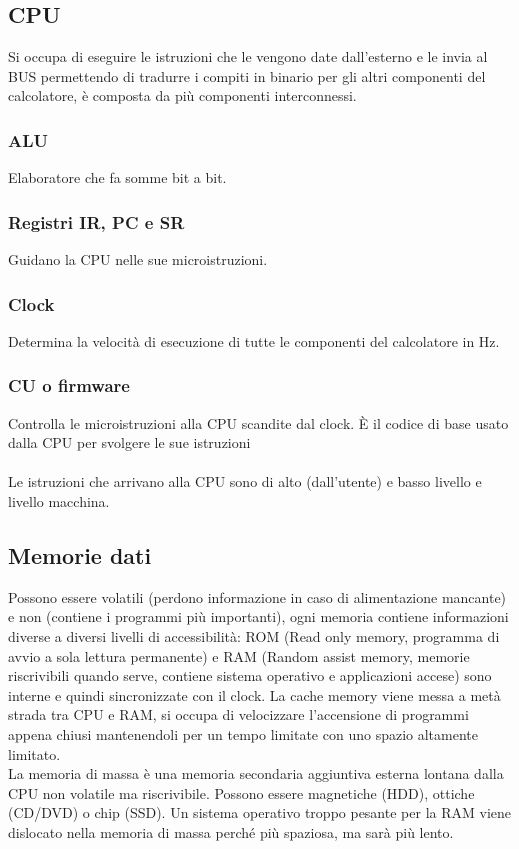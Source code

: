 \documentclass[10pt]{article}
\begin{document}
\subsection*{CPU}
Si occupa di eseguire le istruzioni che le vengono date dall'esterno e le invia al BUS permettendo di tradurre i compiti in binario per gli altri componenti del calcolatore, è composta da più componenti interconnessi.
\subsubsection*{ALU}
Elaboratore che fa somme bit a bit.
\subsubsection*{Registri IR, PC e SR}
Guidano la CPU nelle sue microistruzioni.
\subsubsection*{Clock}
Determina la velocità di esecuzione di tutte le componenti del calcolatore in Hz.
\subsubsection*{CU o firmware}
Controlla le microistruzioni alla CPU scandite dal clock. È il codice di base usato dalla CPU per svolgere le sue istruzioni\\
\\
Le istruzioni che arrivano alla CPU sono di alto (dall'utente) e basso livello e livello macchina.\\
\subsection*{Memorie dati}
Possono essere volatili (perdono informazione in caso di alimentazione mancante) e non (contiene i programmi più importanti), ogni memoria contiene informazioni diverse a diversi livelli di accessibilità: ROM (Read only memory, programma di avvio a sola lettura permanente) e RAM (Random assist memory, memorie riscrivibili quando serve, contiene sistema operativo e applicazioni accese) sono interne e quindi sincronizzate con il clock. La cache memory viene messa a metà strada tra CPU e RAM, si occupa di velocizzare l'accensione di programmi appena chiusi mantenendoli per un tempo limitate con uno spazio altamente limitato. \\
La memoria di massa è una memoria secondaria aggiuntiva esterna lontana dalla CPU non volatile ma riscrivibile. Possono essere magnetiche (HDD), ottiche (CD/DVD) o chip (SSD). Un sistema operativo troppo pesante per la RAM viene dislocato nella memoria di massa perché più spaziosa, ma sarà più lento.\\
\end{document}
